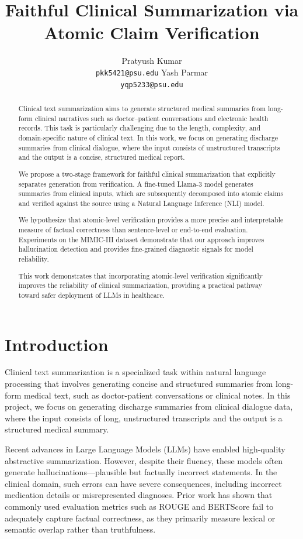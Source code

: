 \documentclass[11pt]{article}
\title{Faithful Clinical Summarization via Atomic Claim Verification}
\author{
Pratyush Kumar \\
{\tt pkk5421@psu.edu}
\And
Yash Parmar \\
{\tt yqp5233@psu.edu}
}
\begin{document}
\maketitle



\begin{abstract}
Clinical text summarization aims to generate structured medical summaries from long-form clinical narratives such as doctor–patient conversations and electronic health records. This task is particularly challenging due to the length, complexity, and domain-specific nature of clinical text. In this work, we focus on generating discharge summaries from clinical dialogue, where the input consists of unstructured transcripts and the output is a concise, structured medical report.

We propose a two-stage framework for faithful clinical summarization that explicitly separates generation from verification. A fine-tuned Llama-3 model generates summaries from clinical inputs, which are subsequently decomposed into atomic claims and verified against the source using a Natural Language Inference (NLI) model. 

We hypothesize that atomic-level verification provides a more precise and interpretable measure of factual correctness than sentence-level or end-to-end evaluation. Experiments on the MIMIC-III dataset demonstrate that our approach improves hallucination detection and provides fine-grained diagnostic signals for model reliability.

This work demonstrates that incorporating atomic-level verification significantly improves the reliability of clinical summarization, providing a practical pathway toward safer deployment of LLMs in healthcare.
\end{abstract}


\section{Introduction}

Clinical text summarization is a specialized task within natural language processing that involves generating concise and structured summaries from long-form medical text, such as doctor-patient conversations or clinical notes. In this project, we focus on generating discharge summaries from clinical dialogue data, where the input consists of long, unstructured transcripts and the output is a structured medical summary.

Recent advances in Large Language Models (LLMs) have enabled high-quality abstractive summarization. However, despite their fluency, these models often generate hallucinations—plausible but factually incorrect statements. In the clinical domain, such errors can have severe consequences, including incorrect medication details or misrepresented diagnoses. Prior work has shown that commonly used evaluation metrics such as ROUGE and BERTScore fail to adequately capture factual correctness, as they primarily measure lexical or semantic overlap rather than truthfulness.
\end{document}

